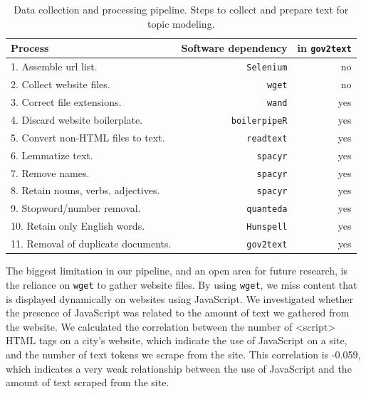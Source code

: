 \documentclass[11pt]{article}
\begin{document}
\begin{table}[ht]
    \centering
    \begin{tabular}{lrr}
        \hline
        Process & Software dependency & in \texttt{gov2text} \\
        \hline
        1. Assemble url list. & \texttt{Selenium} & no \\
        2. Collect website files. & \texttt{wget} & no \\
        3. Correct file extensions. & \texttt{wand} \citep{wand} & yes \\
        4. Discard website boilerplate. & \texttt{boilerpipeR} \citep{boilerpipeR} & yes \\
        5. Convert non-HTML files to text. & \texttt{readtext} \citep{readtext} & yes \\
        6. Lemmatize text. & \texttt{spacyr} \citep{spacyr}& yes \\
        7. Remove names. & \texttt{spacyr} & yes \\
        8. Retain nouns, verbs, adjectives. & \texttt{spacyr} & yes \\
        9. Stopword/number removal. & \texttt{quanteda} \citep{quanteda} & yes \\ 
        10. Retain only English words. & \texttt{Hunspell} \citep{hunspell} & yes \\
        11. Removal of duplicate documents. & \texttt{gov2text} & yes \\
        \hline
    \end{tabular}
    \caption{\label{tab:list} Data collection and processing pipeline. Steps to collect and prepare text for topic modeling.}  \vspace{-.5cm}
\end{table}

The biggest limitation in our pipeline, and an open area for future research, is the reliance on \texttt{wget} to gather website files. By using \texttt{wget}, we miss content that is displayed dynamically on websites using JavaScript. We investigated whether the presence of JavaScript was related to the amount of text we gathered from the website. We calculated the correlation between the number of <script> HTML tags on a city's website, which indicate the use of JavaScript on a site, and the number of text tokens we scrape from the site. This correlation is -0.059, which indicates a very weak relationship between the use of JavaScript and the amount of text scraped from the site.
\end{document}
